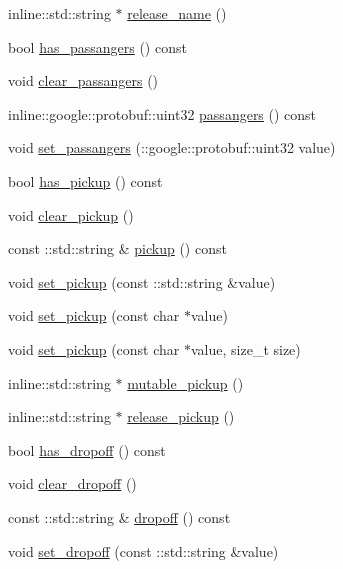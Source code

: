 \begin{DoxyCompactItemize}
\item 
inline\-::std\-::string $\ast$ \hyperlink{classPatronInfo_a116e088e0565693c55da9c268ba650c5}{release\-\_\-name} ()
\item 
bool \hyperlink{classPatronInfo_a644713c3cc9ef11b3a8307d004942497}{has\-\_\-passangers} () const 
\item 
void \hyperlink{classPatronInfo_a91fedcefd27165744d00b2bda62447bd}{clear\-\_\-passangers} ()
\item 
inline\-::google\-::protobuf\-::uint32 \hyperlink{classPatronInfo_a1e0568a70515dfcad8940903d9638c4b}{passangers} () const 
\item 
void \hyperlink{classPatronInfo_a113962bc26a04e47d45ad76f1a487bfb}{set\-\_\-passangers} (\-::google\-::protobuf\-::uint32 value)
\item 
bool \hyperlink{classPatronInfo_a926cd7f792707d24742101989ca3caa1}{has\-\_\-pickup} () const 
\item 
void \hyperlink{classPatronInfo_ae272233bb3967bf42677d10f72336386}{clear\-\_\-pickup} ()
\item 
const \-::std\-::string \& \hyperlink{classPatronInfo_a95e3e2bb80dd7f454112412f6225eca3}{pickup} () const 
\item 
void \hyperlink{classPatronInfo_a4cdf29c5d17135ee7a6dcf498dc432b0}{set\-\_\-pickup} (const \-::std\-::string \&value)
\item 
void \hyperlink{classPatronInfo_a118d5840a783efbff5d78f39de4b2a60}{set\-\_\-pickup} (const char $\ast$value)
\item 
void \hyperlink{classPatronInfo_a394741fecedc180d65b2fe9ec2dd2a19}{set\-\_\-pickup} (const char $\ast$value, size\-\_\-t size)
\item 
inline\-::std\-::string $\ast$ \hyperlink{classPatronInfo_a38788fc986582b9b456c06ab3bce3cec}{mutable\-\_\-pickup} ()
\item 
inline\-::std\-::string $\ast$ \hyperlink{classPatronInfo_a114b41a8d7b5ac654e52b3c19d79487e}{release\-\_\-pickup} ()
\item 
bool \hyperlink{classPatronInfo_aa0d861b566fbb82852b29c31c3b690be}{has\-\_\-dropoff} () const 
\item 
void \hyperlink{classPatronInfo_a885aef9e296d4d9366fb04eb40781c34}{clear\-\_\-dropoff} ()
\item 
const \-::std\-::string \& \hyperlink{classPatronInfo_abd24f266565e0f954dc3b91c6bf17bee}{dropoff} () const 
\item 
void \hyperlink{classPatronInfo_a8a5992962abeb9d626d7fcf1be4da66e}{set\-\_\-dropoff} (const \-::std\-::string \&value)

\end{DoxyCompactItemize}
